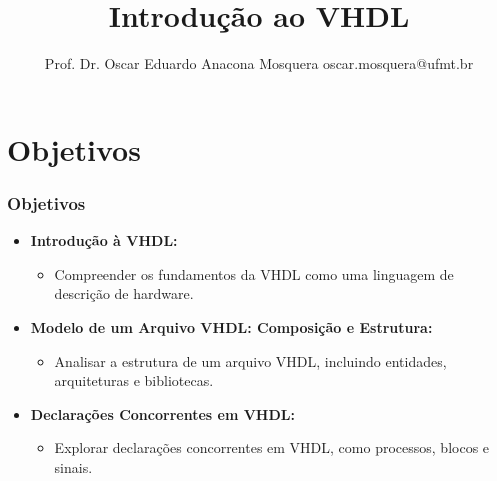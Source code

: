 \documentclass[aspectratio=169]{beamer}
\title[Minicurso FPGAs]{\huge Introdução ao VHDL}
\author[Prof. Dr. Oscar Eduardo Anacona Mosquera]{Prof. Dr. Oscar Eduardo Anacona Mosquera \newline\newline 
\scriptsize{oscar.mosquera@ufmt.br}
}
\begin{document}
\begin{frame}[plain]
\titlepage

\end{frame}


\section{Objetivos}

\begin{frame}
	\frametitle{Objetivos}
	
	\begin{itemize}
		\justifying
		\item \textbf{Introdução à VHDL:}
		\begin{itemize}
			\justifying
			\item Compreender os fundamentos da VHDL como uma linguagem de descrição de hardware.
		\end{itemize}
		
		\item \textbf{Modelo de um Arquivo VHDL: Composição e Estrutura:}
		\begin{itemize}
			\justifying
			\item Analisar a estrutura de um arquivo VHDL, incluindo entidades, arquiteturas e bibliotecas.
		\end{itemize}
		
		\item \textbf{Declarações Concorrentes em VHDL:}
		\begin{itemize}
			\justifying
			\item Explorar declarações concorrentes em VHDL, como processos, blocos e sinais.
		\end{itemize}
		

\end{itemize}
\end{frame}
\end{document}
